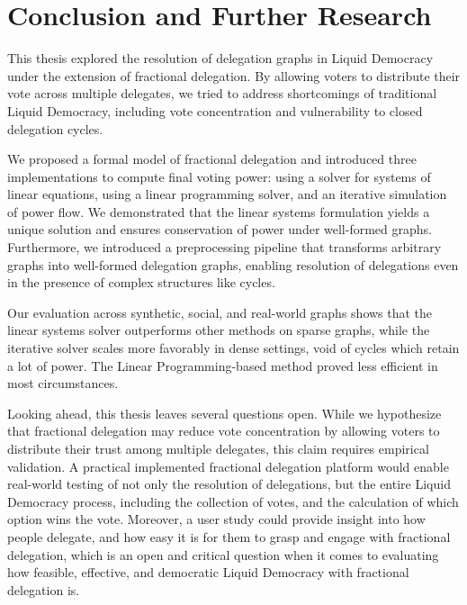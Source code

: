 
\chapter{Conclusion and Further Research}
\label{chap:conclusion}

This thesis explored the resolution of delegation graphs in Liquid Democracy under the extension of fractional delegation. By allowing voters to distribute their vote across multiple delegates, we tried to address shortcomings of traditional Liquid Democracy, including vote concentration and vulnerability to closed delegation cycles.

We proposed a formal model of fractional delegation and introduced three implementations to compute final voting power: using a solver for systems of linear equations, using a linear programming solver, and an iterative simulation of power flow. We demonstrated that the linear systems formulation yields a unique solution and ensures conservation of power under well-formed graphs. Furthermore, we introduced a preprocessing pipeline that transforms arbitrary graphs into well-formed delegation graphs, enabling resolution of delegations even in the presence of complex structures like cycles.

Our evaluation across synthetic, social, and real-world graphs shows that the linear systems solver outperforms other methods on sparse graphs, while the iterative solver scales more favorably in dense settings, void of cycles which retain a lot of power. The Linear Programming-based method proved less efficient in most circumstances. 

Looking ahead, this thesis leaves several questions open. While we hypothesize that fractional delegation may reduce vote concentration by allowing voters to distribute their trust among multiple delegates, this claim requires empirical validation. A practical implemented fractional delegation platform would enable real-world testing of not only the resolution of delegations, but the entire Liquid Democracy process, including the collection of votes, and the calculation of which option wins the vote. Moreover, a user study could provide insight into how people delegate, and how easy it is for them to grasp and engage with fractional delegation, which is an open and critical question when it comes to evaluating how feasible, effective, and democratic Liquid Democracy with fractional delegation is. 
